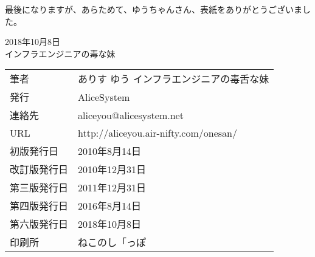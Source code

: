 最後になりますが、あらためて、ゆうちゃんさん、表紙をありがとうございました。

\begin{flushright}
2018年10月8日 \\
インフラエンジニアの毒な妹 \\
\end{flushright}


\newpage

\thispagestyle{empty}
\mbox{}
\newpage
\clearpage


\thispagestyle{empty}

\vspace*{\fill}
\begin{tabular}{ll} \toprule
筆者 & ありす ゆう インフラエンジニアの毒舌な妹 \\
発行 & AliceSystem \\
連絡先 & aliceyou@alicesystem.net \\
URL & http://aliceyou.air-nifty.com/onesan/ \\
初版発行日 & 2010年8月14日 \\
改訂版発行日 & 2010年12月31日 \\
第三版発行日 & 2011年12月31日 \\
第四版発行日 & 2016年8月14日 \\
第六版発行日 & 2018年10月8日 \\
印刷所 & ねこのし「っぽ \\ \bottomrule
\end{tabular}